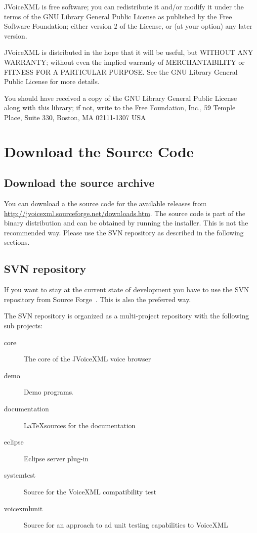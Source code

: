 \documentclass[11pt,a4paper]{article}
\begin{document}
JVoiceXML is free software; you can redistribute it and/or
modify it under the terms of the GNU Library General Public
License as published by the Free Software Foundation; either
version 2 of the License, or (at your option) any later version.

JVoiceXML is distributed in the hope that it will be useful,
but WITHOUT ANY WARRANTY; without even the implied warranty of
MERCHANTABILITY or FITNESS FOR A PARTICULAR PURPOSE. See the GNU
Library General Public License for more details.

You should have received a copy of the GNU Library General Public
License along with this library; if not, write to the Free
Foundation, Inc., 59 Temple Place, Suite 330, Boston, MA  02111-1307  USA

\section{Download the Source Code}

\subsection{Download the source archive}

You can download a the source code for the available releases from 
\url{http://jvoicexml.sourceforge.net/downloads.htm}. The source code is part of
the binary distribution and can be obtained by running the installer. This is
not the recommended way. Please use the SVN repository as described in
the following sections. \\

\subsection{SVN repository}
\label{sec:svn-repository}

If you want to stay at the current state of development you have to use
the SVN repository from Source Forge~\cite{sourceforge}.
This is also the preferred way.

The SVN repository is organized as a multi-project repository with the following
sub projects:
\begin{description}
\item[core] The core of the JVoiceXML voice browser
\item[demo] Demo programs.
\item[documentation] \LaTeX sources for the documentation
\item[eclipse] Eclipse server plug-in
\item[systemtest] Source for the VoiceXML compatibility test
\item[voicexmlunit] Source for an approach to ad unit testing capabilities to VoiceXML
\end{description}
\end{document}
